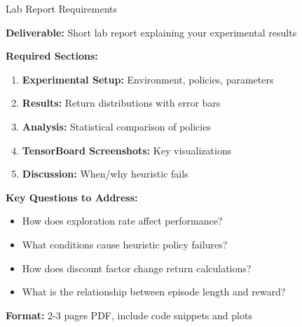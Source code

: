 \documentclass[aspectratio=169,10pt]{beamer}
\begin{document}
\begin{frame}{Lab Report Requirements}

\textbf{Deliverable:} Short lab report explaining your experimental results

\vfill

\textbf{Required Sections:}
\begin{enumerate}
    \item \textbf{Experimental Setup:} Environment, policies, parameters
    \item \textbf{Results:} Return distributions with error bars
    \item \textbf{Analysis:} Statistical comparison of policies  
    \item \textbf{TensorBoard Screenshots:} Key visualizations
    \item \textbf{Discussion:} When/why heuristic fails
\end{enumerate}

\vfill

\textbf{Key Questions to Address:}
\begin{itemize}
    \item How does exploration rate affect performance?
    \item What conditions cause heuristic policy failures?
    \item How does discount factor change return calculations?
    \item What is the relationship between episode length and reward?
\end{itemize}

\vfill

\textbf{Format:} 2-3 pages PDF, include code snippets and plots

\end{frame}
\end{document}

